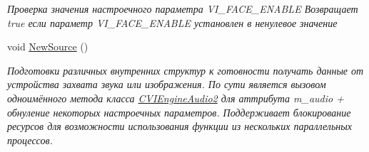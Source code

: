 \begin{DoxyCompactItemize}
$$\begin{DoxyCompactList}\small\item\em Проверка значения настроечного параметра V\+I\+\_\+\+F\+A\+C\+E\+\_\+\+E\+N\+A\+B\+L\+E Возвращает true если параметр V\+I\+\_\+\+F\+A\+C\+E\+\_\+\+E\+N\+A\+B\+L\+E установлен в ненулевое значение \end{DoxyCompactList}\item 
void \hyperlink{class_c_v_i_engine_base_afcadee160287c12571501a09c222bea3}{New\+Source} ()
\begin{DoxyCompactList}\small\item\em Подготовки различных внутренних структур к готовности получать данные от устройства захвата звука или изображения. По сути является вызовом одноимённого метода класса \hyperlink{class_c_v_i_engine_audio2}{C\+V\+I\+Engine\+Audio2} для аттрибута m\+\_\+audio + обнуление некоторых настроечных параметров. Поддерживает блокирование ресурсов для возможности использования функции из нескольких параллельных процессов. \end{DoxyCompactList}\end{DoxyCompactItemize}
